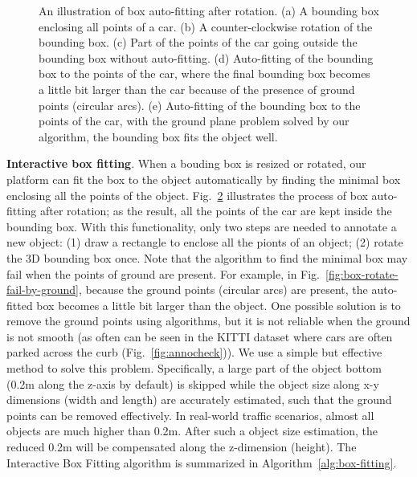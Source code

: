 \documentclass[letterpaper, 10 pt, conference]{ieeeconf}  %
\begin{document}
\begin{figure}[t]
\begin{subfigure}[t]{0.18\linewidth}
		\caption{}
		\label{fig:box-rotate-correctly}
	\end{subfigure}\hfill
	\caption{ 
		An illustration of box auto-fitting after rotation. (a) A bounding box enclosing all points of a car. (b) A counter-clockwise rotation of the bounding box. (c) Part of the points of the car going outside the bounding box without auto-fitting. (d) Auto-fitting of the bounding box to the points of the car, where the final bounding box becomes a little bit larger than the car because of the presence of ground points (circular arcs). (e) Auto-fitting of the bounding box to the points of the car, with the ground plane problem solved by our algorithm,  the bounding box fits the object well.}
	\label{fig:boundary-aware-rotation}
	\vspace{-0.3cm}
\end{figure}



\textbf{Interactive box fitting}. 
When a bouding box is resized or rotated, our platform can fit the box to the object automatically by finding the minimal box enclosing all the points of the object. Fig.~\ref{fig:boundary-aware-rotation} illustrates the process of box auto-fitting after rotation; as the result, all the points of the car are kept inside the bounding box. 
With this functionality, only two steps are needed to annotate a new object: (1) draw a rectangle to enclose all the pionts of an object; (2) rotate the 3D bounding box once. Note that the algorithm to find the minimal box may fail when the points of ground are present. 
For example, in Fig.~\ref{fig:box-rotate-fail-by-ground}, because the ground points (circular arcs) are present, the auto-fitted box becomes a little bit larger than the object. 
One possible solution is to remove the ground points using algorithms, but it is not reliable when the ground is not smooth (as often can be seen in the KITTI dataset \cite{Geiger2012CVPR} where cars are often parked across the curb (Fig.~\ref{fig:annocheck})). We use a simple but effective method to solve this problem. Specifically, a large part  of the object bottom  (0.2m along the z-axis by default) is skipped while the object size along x-y dimensions (width and length) are accurately estimated, such that the ground points can be removed effectively. In real-world traffic scenarios, almost all objects are much higher than 0.2m. After such a object size estimation, the reduced 0.2m will be compensated along the z-dimension (height). The Interactive Box Fitting algorithm is summarized in Algorithm~\ref{alg:box-fitting}.
\end{document}
